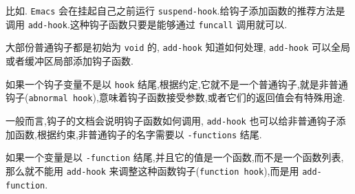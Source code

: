 \documentclass[11pt]{article}
\begin{document}
比如. \texttt{Emacs} 会在挂起自己之前运行 \texttt{suspend-hook}.给钩子添加函数的推荐方法是调用 \texttt{add-hook}.这种钩子函数只要是能够通过 \texttt{funcall} 调用就可以.

大部份普通钩子都是初始为 \texttt{void} 的, \texttt{add-hook} 知道如何处理, \texttt{add-hook} 可以全局或者缓冲区局部添加钩子函数.

如果一个钩子变量不是以 \texttt{hook} 结尾,根据约定,它就不是一个普通钩子,就是非普通钩子(\texttt{abnormal hook}),意味着钩子函数接受参数,或者它们的返回值会有特殊用途.

一般而言,钩子的文档会说明钩子函数如何调用, \texttt{add-hook} 也可以给非普通钩子添加函数,根据约束,非普通钩子的名字需要以 \texttt{-functions} 结尾.

如果一个变量是以 \texttt{-function} 结尾,并且它的值是一个函数,而不是一个函数列表,那么就不能用 \texttt{add-hook} 来调整这种函数钩子(\texttt{function hook}),而是用 \texttt{add-function}.
\end{document}
